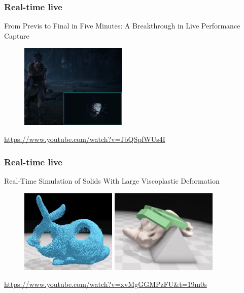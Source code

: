 \frame
{
	\frametitle{Real-time live}
	From Previs to Final in Five Minutes: A Breakthrough in Live Performance Capture
	
	\begin{figure}
		\centering
		\includegraphics[height=4cm]{img/rtl.png}
	\end{figure}
	
	\centering
	\url{https://www.youtube.com/watch?v=JbQSpfWUs4I }
	
	
}
\frame
{
	\frametitle{Real-time live}
	
	Real-Time Simulation of Solids With Large Viscoplastic Deformation\\
	\begin{figure}
		\centering
		\includegraphics[height=4cm]{img/visco1.png}
		\includegraphics[height=4cm]{img/visco2.png}
	\end{figure}
	\centering
	\url{https://www.youtube.com/watch?v=xvMgGGMPzFU&t=19m0s}
}

